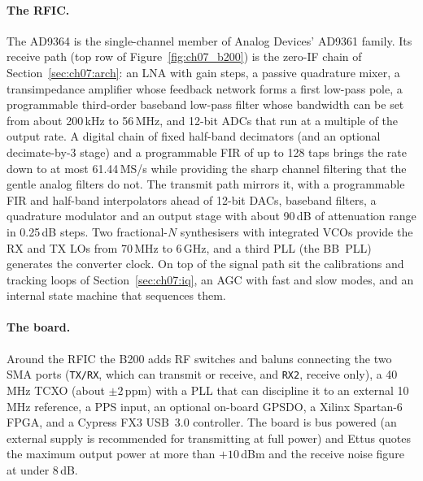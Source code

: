 \paragraph{The RFIC.} The AD9364 is the single-channel member of Analog Devices' AD9361 family. Its
receive path (top row of Figure~\ref{fig:ch07_b200}) is the zero-IF chain of
Section~\ref{sec:ch07:arch}: an LNA with gain steps, a passive quadrature mixer, a transimpedance
amplifier whose feedback network forms a first low-pass pole, a programmable third-order baseband
low-pass filter whose bandwidth can be set from about 200\,kHz to 56\,MHz, and 12-bit ADCs that run at a
multiple of the output rate. A digital chain of fixed half-band decimators (and an optional
decimate-by-3 stage) and a programmable FIR of up to 128 taps brings the rate down to at most
61.44\,MS/s while providing the sharp channel filtering that the gentle analog filters do not. The
transmit path mirrors it, with a programmable FIR and half-band interpolators ahead of 12-bit DACs,
baseband filters, a quadrature modulator and an output stage with about 90\,dB of attenuation range in
0.25\,dB steps. Two fractional-$N$ synthesisers with integrated VCOs provide the RX and TX LOs from 70\,MHz
to 6\,GHz, and a third PLL (the BB~PLL) generates the converter clock. On top of the signal path sit the
calibrations and tracking loops of Section~\ref{sec:ch07:iq}, an AGC with fast and slow modes, and an
internal state machine that sequences them.

\paragraph{The board.} Around the RFIC the B200 adds RF switches and baluns connecting the two SMA ports
(\texttt{TX/RX}, which can transmit or receive, and \texttt{RX2}, receive only), a 40\,MHz TCXO
(about $\pm2$\,ppm) with a PLL that can discipline it to an external 10\,MHz reference, a PPS input, an
optional on-board GPSDO, a Xilinx Spartan-6 FPGA, and a Cypress FX3 USB~3.0 controller. The board is bus
powered (an external supply is recommended for transmitting at full power) and Ettus quotes the maximum
output power at more than $+10$\,dBm and the receive noise figure at under 8\,dB.



